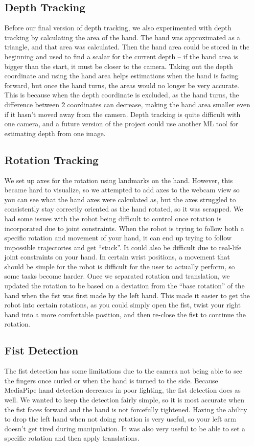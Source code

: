 \documentclass{article}
\begin{document}
\subsection{Depth Tracking}
Before our final version of depth tracking, we also experimented with depth tracking by calculating the area of the hand. The hand was approximated as a triangle, and that area was calculated. Then the hand area could be stored in the beginning and used to find a scalar for the current depth – if the hand area is bigger than the start, it must be closer to the camera. Taking out the depth coordinate and using the hand area helps estimations when the hand is facing forward, but once the hand turns, the areas would no longer be very accurate. This is because when the depth coordinate is excluded, as the hand turns, the difference between 2 coordinates can decrease, making the hand area smaller even if it hasn’t moved away from the camera. Depth tracking is quite difficult with one camera, and a future version of the project could use another ML tool for estimating depth from one image. 

\subsection{Rotation Tracking}
We set up axes for the rotation using landmarks on the hand. However, this became hard to visualize, so we attempted to add axes to the webcam view so you can see what the hand axes were calculated as, but the axes struggled to consistently stay correctly oriented as the hand rotated, so it was scrapped. 
We had some issues with the robot being difficult to control once rotation is incorporated due to joint constraints. When the robot is trying to follow both a specific rotation and movement of your hand, it can end up trying to follow impossible trajectories and get “stuck”. It could also be difficult due to real-life joint constraints on your hand. In certain wrist positions, a movement that should be simple for the robot is difficult for the user to actually perform, so some tasks become harder. 
Once we separated rotation and translation, we updated the rotation to be based on a deviation from the “base rotation” of the hand when the fist was first made by the left hand. This made it easier to get the robot into certain rotations, as you could simply open the fist, twist your right hand into a more comfortable position, and then re-close the fist to continue the rotation.

\subsection{Fist Detection}
The fist detection has some limitations due to the camera not being able to see the fingers once curled or when the hand is turned to the side. Because MediaPipe hand detection decreases in poor lighting, the fist detection does as well. We wanted to keep the detection fairly simple, so it is most accurate when the fist faces forward and the hand is not forcefully tightened. Having the ability to drop the left hand when not doing rotation is very useful, so your left arm doesn’t get tired during manipulation. It was also very useful to be able to set a specific rotation and then apply translations.
\end{document}
